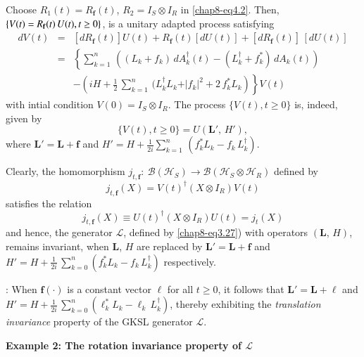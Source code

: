 Choose $R_1(t)=R_{\mathbf{f}}(t)$, $R_2=I_S\otimes I_R$ in \eqref{chap8-eq4.2}.  Then, $\{V(t)=R_{\mathbf{f}}(t)\,U(t),\break t\geq 0\}$,  is a unitary adapted process satisfying     
\begin{eqnarray}
dV(t)&=& \left[ dR_{\mathbf{f}}(t)\right] U(t)+ R_{\mathbf{f}}(t) \left[ dU(t)\right]+\left[ dR_{\mathbf{f}}(t) \right]\,  
\left[dU(t)\right] \nonumber \\ 
&=& \left\{\sum_{k=1}^n\, \left((L_k+f_k)\, dA^\dag_k(t) - (L^\dag_k+f^*_k)\, dA_k(t) \right) \right.\nonumber \\ 
&&  \left. - \left(iH+\frac{1}{2}\, 
\sum_{k=1}^n\,(L_k^\dag L_k+ \vert f_{k}\vert^2 + 2\, f_k^*L_k\right) \right\}\! V(t) \label{chap8-eq4.10}
\end{eqnarray}    
with intial condition $V(0)=I_S\otimes I_R$. The process $\{V(t), t\geq 0\}$ is, indeed, given by 
$$
\{V(t), t\geq 0\}=U\left(\mathbf{L}',\, H'\right),
$$
where  $\mathbf{L}'=\mathbf{L}+\mathbf{f}$ and $H'=H+\frac{1}{2i}\sum_{k=1}^n\, \left(f_k^*L_k-f_k\, L_k^\dag\right).$    

Clearly, the homomorphism $j_{t,\mathbf{f}}:  \ \mathcal{B}(\mathcal{H}_S)\longrightarrow 
\mathcal{B}(\mathcal{H}_S\otimes\mathcal{H}_R)$ defined by  
$$
j_{t,\mathbf{f}} (X) = V(t)^{\dagger} (X \otimes I_R)  V(t)
$$
satisfies the relation 
$$
j_{t,\mathbf{f}} (X)\equiv U(t)^{\dagger} (X \otimes I_R)  U(t)=j_t(X)
$$  
and hence,  the generator $\mathcal{L}$,  defined by \eqref{chap8-eq3.27}) with operators $(\mathbf{L},\, H)$, remains invariant, when $\mathbf{L}$, $H$ are replaced by $\mathbf{L}'=\mathbf{L}+\mathbf{f}$ and $H'=H+\frac{1}{2i}\, \displaystyle\sum_{k=0}^{n}(f_k^*L_k-f_k\, L_k^\dag)$ respectively. 

: When $\mathbf{f}(\cdot)$ is a constant vector $\pmb{\ell}$ for all $t\geq 0$, it follows that $\mathbf{L}'=\mathbf{L}+\pmb{\ell}$ and $H'=H+\frac{1}{2i}\, \displaystyle\sum_{k=0}^{n}(\ell_k^*L_k-\ell_k\, L_k^\dag)$, thereby exhibiting the {\em translation invariance} property of the GKSL generator $\mathcal{L}$. 
\bigskip 

\noindent \textbf{\large Example 2: The rotation invariance property of $\mathcal{L}$} 
\bigskip

